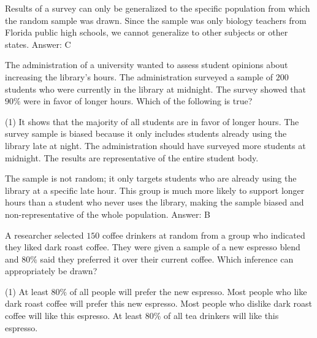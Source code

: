 \documentclass[11pt,paper=a4,answers]{exam}
\begin{document}
\begin{questions}
\begin{solution}
Results of a survey can only be generalized to the specific population from which the random sample was drawn. Since the sample was only biology teachers from Florida public high schools, we cannot generalize to other subjects or other states.
\vspace{5pt}
Answer: \colorbox{yellow!100}{C}
\end{solution}

\vspace{1cm}

\question
The administration of a university wanted to assess student opinions about increasing the library's hours. The administration surveyed a sample of $200$ students who were currently in the library at midnight. The survey showed that $90\%$ were in favor of longer hours. Which of the following is true?
\begin{tasks}(1)
    \task It shows that the majority of all students are in favor of longer hours.
    \task The survey sample is biased because it only includes students already using the library late at night.
    \task The administration should have surveyed more students at midnight.
    \task The results are representative of the entire student body.
\end{tasks}

\begin{solution}
The sample is not random; it only targets students who are already using the library at a specific late hour. This group is much more likely to support longer hours than a student who never uses the library, making the sample biased and non-representative of the whole population.
\vspace{5pt}
Answer: \colorbox{yellow!100}{B}
\end{solution}

\vspace{1cm}

\question
A researcher selected $150$ coffee drinkers at random from a group who indicated they liked dark roast coffee. They were given a sample of a new espresso blend and $80\%$ said they preferred it over their current coffee. Which inference can appropriately be drawn?
\begin{tasks}(1)
    \task At least $80\%$ of all people will prefer the new espresso.
    \task Most people who like dark roast coffee will prefer this new espresso.
    \task Most people who dislike dark roast coffee will like this espresso.
    \task At least $80\%$ of all tea drinkers will like this espresso.
\end{tasks}


\end{questions}
\end{document}
